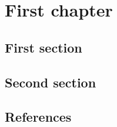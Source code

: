\chapter{First chapter}

\section{First section}\lipsum
\section{Second section}\cite{2021MNRASDavidClerisDustywave}\lipsum


\section*{References}

